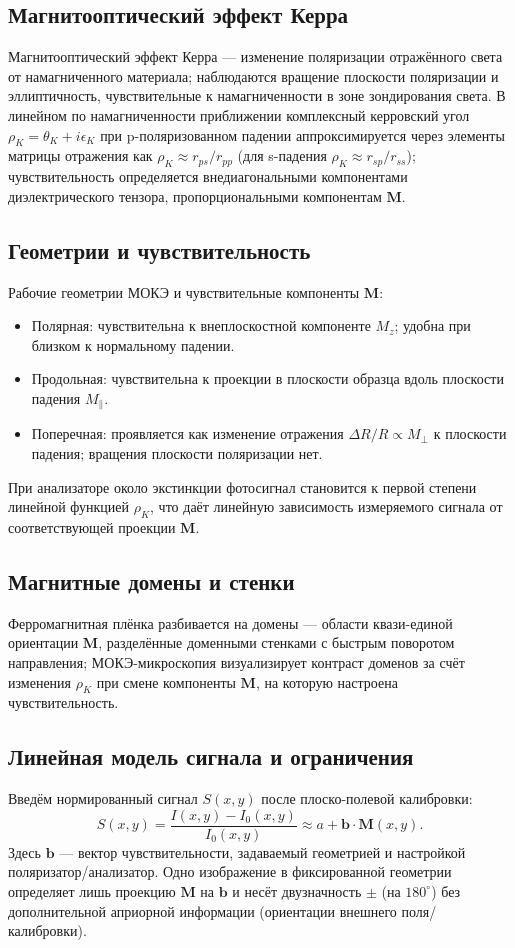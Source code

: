 \documentclass[12pt,a4paper]{article}
\numberwithin{equation}{section}
\begin{document}
\subsection{Магнитооптический эффект Керра}
Магнитооптический эффект Керра — изменение поляризации отражённого света от намагниченного материала; наблюдаются вращение плоскости поляризации и эллиптичность, чувствительные к намагниченности в зоне зондирования света. В линейном по намагниченности приближении комплексный керровский угол \(\rho_K=\theta_K+i\epsilon_K\) при p-поляризованном падении аппроксимируется через элементы матрицы отражения как \(\rho_K\approx r_{ps}/r_{pp}\) (для s-падения \(\rho_K\approx r_{sp}/r_{ss}\)); чувствительность определяется внедиагональными компонентами диэлектрического тензора, пропорциональными компонентам \(\mathbf M\).

\subsection{Геометрии и чувствительность}
Рабочие геометрии МОКЭ и чувствительные компоненты \(\mathbf M\):
\begin{itemize}
  \item Полярная: чувствительна к внеплоскостной компоненте \(M_z\); удобна при близком к нормальному падении.
  \item Продольная: чувствительна к проекции в плоскости образца вдоль плоскости падения \(M_{\parallel}\).
  \item Поперечная: проявляется как изменение отражения \(\Delta R/R \propto M_{\perp}\) к плоскости падения; вращения плоскости поляризации нет.
\end{itemize}
При анализаторе около экстинкции фотосигнал становится к первой степени линейной функцией \(\rho_K\), что даёт линейную зависимость измеряемого сигнала от соответствующей проекции \(\mathbf M\).

\subsection{Магнитные домены и стенки}
Ферромагнитная плёнка разбивается на домены — области квази-единой ориентации \(\mathbf M\), разделённые доменными стенками с быстрым поворотом направления; МОКЭ-микроскопия визуализирует контраст доменов за счёт изменения \(\rho_K\) при смене компоненты \(\mathbf M\), на которую настроена чувствительность.

\subsection{Линейная модель сигнала и ограничения}
Введём нормированный сигнал \(S(x,y)\) после плоско-полевой калибровки:
\begin{equation}
 S(x,y)=\frac{I(x,y)-I_0(x,y)}{I_0(x,y)} \approx a + \mathbf b \cdot \mathbf M(x,y).
\end{equation}
Здесь \(\mathbf b\) — вектор чувствительности, задаваемый геометрией и настройкой поляризатор/анализатор. Одно изображение в фиксированной геометрии определяет лишь проекцию \(\mathbf M\) на \(\mathbf b\) и несёт двузначность \(\pm\) (на \(180^\circ\)) без дополнительной априорной информации (ориентации внешнего поля/калибровки).
\end{document}
